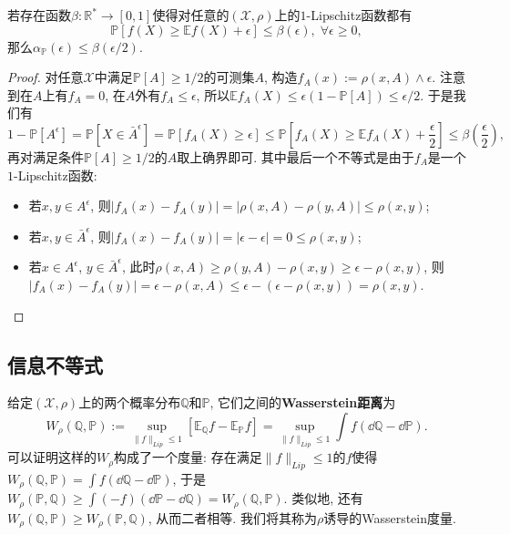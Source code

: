 \begin{theorem}
	若存在函数$\beta \colon \mathbb{R}^* \to [0, 1]$使得对任意的$(\mathcal{X}, \rho)$上的$1$-Lipschitz函数都有
	\begin{equation*}
		\mathbb{P}[f(X) \geq \mathbb{E}f(X) + \epsilon] \leq \beta(\epsilon),\; \forall \epsilon \geq 0, 
	\end{equation*}
	那么$\alpha_{\mathbb{P}}(\epsilon) \leq \beta(\epsilon / 2)$. 
\end{theorem}
\begin{proof}
	对任意$\mathcal{X}$中满足$\mathbb{P}[A] \geq 1/2$的可测集$A$, 构造$f_A(x) := \rho(x, A) \wedge \epsilon$. 
	注意到在$A$上有$f_A = 0$, 在$A$外有$f_A \leq \epsilon$, 所以$\mathbb{E}f_A(X) \leq \epsilon (1 - \mathbb{P}[A]) \leq \epsilon / 2$. 
	于是我们有
	\begin{equation*}
		1 - \mathbb{P}[A^\epsilon]
		= \mathbb{P}[X \in \bar A^{\epsilon}]
		= \mathbb{P}[f_A(X) \geq \epsilon] 
		\leq \mathbb{P}\left[f_A(X) \geq \mathbb{E}f_A(X) + \frac{\epsilon}{2}\right]
		\leq \beta\left( \frac{\epsilon}{2} \right),  
	\end{equation*}
	再对满足条件$\mathbb{P}[A] \geq 1/2$的$A$取上确界即可. 
	其中最后一个不等式是由于$f_A$是一个$1$-Lipschitz函数: 
	\begin{itemize}
		\item 若$x, y \in A^{\epsilon}$, 则$|f_A(x) - f_A(y)| = |\rho(x, A) - \rho(y, A) | \leq  \rho(x, y)$; 
		\item 若$x, y \in \bar A^{\epsilon}$, 则$|f_A(x) - f_A(y)| = |\epsilon - \epsilon| = 0 \leq \rho(x, y)$;
		\item 若$x \in A^{\epsilon}$, $y \in \bar A^{\epsilon}$, 此时$\rho(x, A) \geq \rho(y, A) - \rho(x, y) \geq \epsilon - \rho(x, y)$, 则$|f_A(x) - f_A(y)| =  \epsilon - \rho(x, A) \leq \epsilon - (\epsilon - \rho(x, y)) = \rho(x, y)$.
	\end{itemize}
\end{proof}


\subsection{信息不等式}

给定$(\mathcal{X}, \rho)$上的两个概率分布$\mathbb{Q}$和$\mathbb{P}$, 它们之间的\textbf{Wasserstein距离}为
\begin{equation*}
	W_{\rho}(\mathbb{Q}, \mathbb{P}) 
	:= \sup_{\|f\|_{Lip} \leq 1} \left[ \mathbb{E}_{\mathbb{Q}} f - \mathbb{E}_{\mathbb{P}} f \right]
	= \sup_{\|f\|_{Lip} \leq 1} \int f (\dd \mathbb{Q} - \dd \mathbb{P}). 
\end{equation*}
可以证明这样的$W_{\rho}$构成了一个度量: 
存在满足$\|f\|_{Lip} \leq 1$的$f$使得$W_{\rho}(\mathbb{Q}, \mathbb{P}) = \int f (\dd \mathbb{Q} - \dd \mathbb{P})$, 于是$W_{\rho}(\mathbb{P}, \mathbb{Q}) \geq \int (-f) (\dd \mathbb{P} - \dd \mathbb{Q}) = W_{\rho}(\mathbb{Q}, \mathbb{P})$. 
类似地, 还有$W_{\rho}(\mathbb{Q}, \mathbb{P}) \geq W_{\rho}(\mathbb{P}, \mathbb{Q})$, 从而二者相等. 
我们将其称为$\rho$诱导的Wasserstein度量. 

